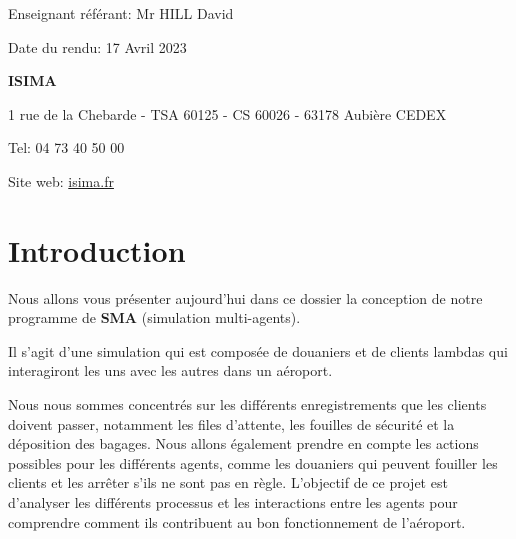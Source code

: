 \documentclass[12pt,french]{article} %
\begin{document}
\begin{titlepage}
  \vspace*{2cm} 
  
  \begin{flushright}\footnotesize %
    Enseignant référant: Mr HILL David
    
    Date du rendu: 17 Avril 2023
    
  \end{flushright}
  
  \begin{flushleft}\small %
    \textbf{ISIMA}
    \footnotesize
    
    1 rue de la Chebarde - TSA 60125 - CS 60026 - 63178 Aubière CEDEX
    
    Tel: 04 73 40 50 00
    
    Site web: \href{https://www.isima.fr/}{isima.fr}\newline
    	
  \end{flushleft}
\end{titlepage}	


\renewcommand{\contentsname}{Sommaire}
\normalsize\tableofcontents %

\bigskip

\newpage

\vspace*{1cm}

\section{Introduction}

Nous allons vous présenter aujourd'hui dans ce dossier la conception de notre programme de \textbf{SMA} (simulation multi-agents).

\bigskip

Il s'agit d'une simulation qui est composée de douaniers et de clients lambdas qui interagiront les uns avec les autres dans un aéroport.

\bigskip

 Nous nous sommes concentrés sur les différents enregistrements que les clients doivent passer, notamment les files d'attente, les fouilles de sécurité et la déposition des bagages. Nous allons également prendre en compte les actions possibles pour les différents agents, comme les douaniers qui peuvent fouiller les clients et les arrêter s'ils ne sont pas en règle. L'objectif de ce projet est d'analyser les différents processus et les interactions entre les agents pour comprendre comment ils contribuent au bon fonctionnement de l'aéroport.
 
\end{document}
